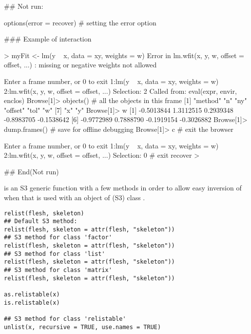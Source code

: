 %
\begin{Examples}
\begin{ExampleCode}
## Not run: 

options(error = recover) # setting the error option

### Example of interaction

> myFit <- lm(y ~ x, data = xy, weights = w)
Error in lm.wfit(x, y, w, offset = offset, ...) :
        missing or negative weights not allowed

Enter a frame number, or 0 to exit
1:lm(y ~ x, data = xy, weights = w)
2:lm.wfit(x, y, w, offset = offset, ...)
Selection: 2
Called from: eval(expr, envir, enclos)
Browse[1]> objects() # all the objects in this frame
[1] "method" "n"      "ny"     "offset" "tol"    "w"
[7] "x"      "y"
Browse[1]> w
[1] -0.5013844  1.3112515  0.2939348 -0.8983705 -0.1538642
[6] -0.9772989  0.7888790 -0.1919154 -0.3026882
Browse[1]> dump.frames() # save for offline debugging
Browse[1]> c # exit the browser

Enter a frame number, or 0 to exit
1:lm(y ~ x, data = xy, weights = w)
2:lm.wfit(x, y, w, offset = offset, ...)
Selection: 0 # exit recover
>


## End(Not run)
\end{ExampleCode}
\end{Examples}
%
\begin{Description}\relax
{} is an S3 generic function with a few methods in order
to allow easy inversion of  when that is used
with an object  of (S3) class .
\end{Description}
%
\begin{Usage}
\begin{verbatim}
relist(flesh, skeleton)
## Default S3 method:
relist(flesh, skeleton = attr(flesh, "skeleton"))
## S3 method for class 'factor'
relist(flesh, skeleton = attr(flesh, "skeleton"))
## S3 method for class 'list'
relist(flesh, skeleton = attr(flesh, "skeleton"))
## S3 method for class 'matrix'
relist(flesh, skeleton = attr(flesh, "skeleton"))

as.relistable(x)
is.relistable(x)

## S3 method for class 'relistable'
unlist(x, recursive = TRUE, use.names = TRUE)
\end{verbatim}
\end{Usage}
